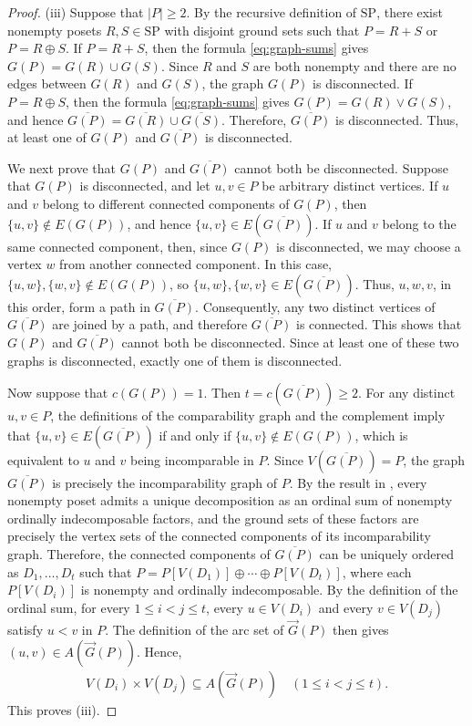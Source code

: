 \documentclass[10pt,a4paper]{amsart}
\begin{document}
\begin{proof}
\textup{(iii)}
Suppose that $|P|\geq 2$.
By the recursive definition of $\mathrm{SP}$, 
there exist nonempty posets $R,S\in\mathrm{SP}$ with disjoint ground sets 
such that $P=R+S$ or $P=R\oplus S$.
If $P=R+S$, then the formula \eqref{eq:graph-sums} gives $G(P)=G(R)\cup G(S)$.
Since $R$ and $S$ are both nonempty and there are no edges between $G(R)$ and $G(S)$, 
the graph $G(P)$ is disconnected.
If $P=R\oplus S$, then the formula \eqref{eq:graph-sums} gives $G(P)=G(R)\vee G(S)$, 
and hence $\overline{G(P)}=\overline{G(R)}\cup\overline{G(S)}$.
Therefore, $\overline{G(P)}$ is disconnected.
Thus, at least one of $G(P)$ and $\overline{G(P)}$ is disconnected.

We next prove that $G(P)$ and $\overline{G(P)}$ cannot both be disconnected.
Suppose that $G(P)$ is disconnected, and let $u,v\in P$ be arbitrary distinct vertices.
If $u$ and $v$ belong to different connected components of $G(P)$,
then $\{u,v\}\notin E(G(P))$, and hence $\{u,v\}\in E(\overline{G(P)})$.
If $u$ and $v$ belong to the same connected component,
then, since $G(P)$ is disconnected, we may choose a vertex $w$ from another connected component.
In this case, $\{u,w\},\{w,v\}\notin E(G(P))$, so $\{u,w\},\{w,v\}\in E(\overline{G(P)})$.
Thus, $u,w,v$, in this order, form a path in $\overline{G(P)}$.
Consequently, any two distinct vertices of $\overline{G(P)}$
are joined by a path, and therefore $\overline{G(P)}$ is connected.
This shows that $G(P)$ and $\overline{G(P)}$ cannot both be disconnected.
Since at least one of these two graphs is disconnected,
exactly one of them is disconnected.

Now suppose that $c(G(P))=1$. Then $t=c(\overline{G(P)})\geq 2$.
For any distinct $u,v\in P$, the definitions of the comparability graph 
and the complement imply that $\{u,v\}\in E(\overline{G(P)})$ if and only if
$\{u,v\}\notin E(G(P))$, which is equivalent to $u$ and $v$ being incomparable in $P$.
Since $V(\overline{G(P)})=P$, the graph $\overline{G(P)}$ 
is precisely the incomparability graph of $P$.
By the result in \cite{ErneHeitzigReinhold2002},
every nonempty poset admits a unique decomposition
as an ordinal sum of nonempty ordinally indecomposable factors,
and the ground sets of these factors are precisely the vertex sets
of the connected components of its incomparability graph.
Therefore, the connected components of $\overline{G(P)}$
can be uniquely ordered as $D_1,\ldots,D_t$ such that
$P=P[V(D_1)]\oplus\cdots\oplus P[V(D_t)]$,
where each $P[V(D_i)]$ is nonempty and ordinally indecomposable.
By the definition of the ordinal sum, for every $1\leq i<j\leq t$, 
every $u\in V(D_i)$ and every $v\in V(D_j)$ satisfy $u<v$ in $P$.
The definition of the arc set of $\vec G(P)$ then gives $(u,v)\in A(\vec G(P))$.
Hence, 
\begin{eqnarray*}
V(D_i)\times V(D_j)\subseteq A(\vec G(P))\quad(1\leq i<j\leq t).
\end{eqnarray*}
This proves \textup{(iii)}.
\end{proof}
\end{document}
